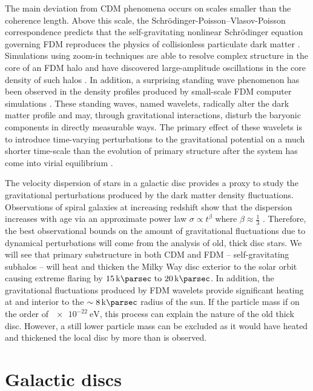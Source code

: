 \documentclass[usenatbib]{mnras}
\begin{document}
\par 

The main deviation from CDM phenomena occurs on scales smaller than the coherence length. Above this scale, the Schr\"{o}dinger-Poisson–Vlasov-Poisson correspondence predicts that the self-gravitating nonlinear Schr\"{o}dinger equation governing FDM reproduces the physics of collisionless particulate dark matter \citep{Schrodinger-Poisson}. Simulations using zoom-in techniques are able to resolve complex structure in the core of an FDM halo and have discovered large-amplitude oscillations in the core density of such halos \citep{structure-FDM-halos}. In addition, a surprising standing wave phenomenon has been observed in the density profiles produced by small-scale FDM computer simulations \citep{cold_and_fuzzy}. These standing waves, named wavelets, radically alter the dark matter profile and may, through gravitational interactions, disturb the baryonic components in directly measurable ways. The primary effect of these wavelets is to introduce time-varying perturbations to the gravitational potential on a much shorter time-scale than the evolution of primary structure after the system has come into virial equilibrium \citep{Schrodinger-Poisson}. 
\par
	The velocity dispersion of stars in a galactic disc provides a proxy to study the gravitational perturbations produced by the dark matter {\color{magenta} density fluctuations}. Observations of spiral galaxies at increasing redshift show that the dispersion increases with age via an approximate power law $\sigma \propto t^\beta$ where $\beta \approx \frac{1}{3}$ \citep{heating_history}. Therefore, the best observational bounds on the amount of gravitational {\color{magenta} fluctuations due to dynamical perturbations} will come from the analysis of old, thick disc stars. {\color{magenta} We will see that primary substructure in both CDM and FDM -- self-gravitating subhalos -- will heat and thicken the Milky Way disc exterior to the solar orbit causing extreme flaring by $\SIrange{15}{20}{\kilo\parsec}$. In addition, the gravitational fluctuations produced by FDM wavelets provide significant heating at and interior to the $\sim \SI{8}{\kilo\parsec}$ radius of the sun. If the particle mass if on the order of $\SI{e-22}{\electronvolt}$, this process can explain the nature of the old thick disc. However, a still lower particle mass can be excluded as it would have heated and thickened the local disc by more than is observed. } 	

\section{Galactic discs}
\end{document}

